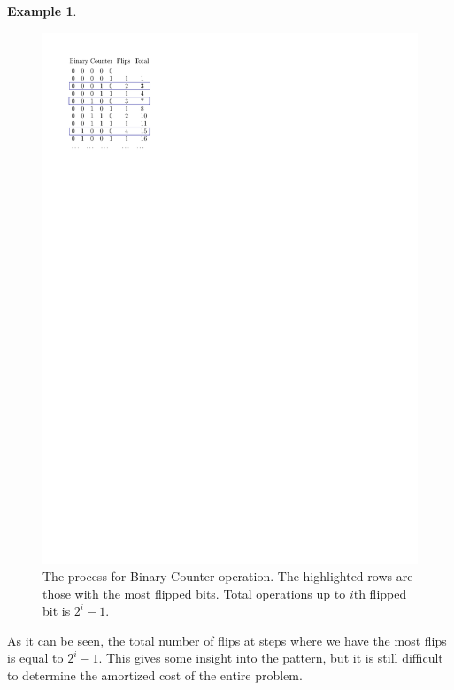 \documentclass[11pt]{article}
\theoremstyle{definition}
\newtheorem{exmp}{Example}[section]
\begin{document}
\begin{exmp}
\begin{figure}[tbh]
\centering
\includegraphics[scale=1]{figures/aggregate.pdf}
\caption{The process for Binary Counter operation.  The highlighted rows are those with  the most flipped bits. Total operations up to $i$th flipped bit is $2^i-1$.}
\label{fig:aggregate}
\end{figure}

As it can be seen, the total number of flips at steps where we have the most flips is equal to $2^i-1$. This gives some insight into the pattern, but it is still difficult to determine the amortized cost of the entire problem.


\end{exmp}
\end{document}
